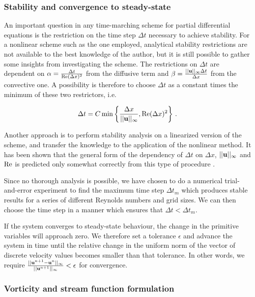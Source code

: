 \documentclass[final,3p,twocolumn]{elsarticle}
\begin{document}
\subsubsection{Stability and convergence to steady-state}

An important question in any time-marching scheme for partial differential
equations is the restriction on the time step $\Delta t$ necessary to achieve
stability. For a nonlinear scheme such as the one employed, analytical
stability restrictions are not available to the best knowledge of the author,
but it is still possible to gather some insights from investigating the scheme.
The restrictions on $\Delta t$ are dependent on $\alpha = \frac{\Delta t}{{\rm
Re} (\Delta x)^2}$ from the diffusive term and $\beta = \frac{||{\bf
u}||_{\infty} \Delta t}{\Delta x}$ from the convective one. A possibility is
therefore to choose $\Delta t$ as a constant times the minimum of these two
restrictors, i.e.\ 

\begin{equation}
    \Delta t = C \min \left\{ \frac{\Delta x}{||{\bf u}||_{\infty}}, {\rm Re} (\Delta x)^2
    \right\} \,.
    \label{eq:timeStep}
\end{equation}
 
Another approach is to perform stability analysis on a linearized version of
the scheme, and transfer the knowledge to the application of the nonlinear
method. It has been shown that the general form of the dependency of $\Delta t$
on $\Delta x$, $||{\bf u}||_{\infty}$ and ${\rm Re}$ is predicted only somewhat
correctly from this type of procedure \cite{kress2006time}. 

Since no thorough analysis is possible, we have chosen to do a numerical
trial-and-error experiment to find the maximum time step $\Delta t_m$ which
produces stable results for a series of different Reynolds numbers and grid
sizes. We can then choose the time step in a manner which ensures that $\Delta
t < \Delta t_m$. 

If the system converges to steady-state behaviour, the change in the primitive
variables will approach zero. We therefore set a tolerance $\epsilon$ and
advance the system in time until the relative change in the uniform norm of the
vector of discrete velocity values becomes smaller than that tolerance.  In
other words, we require $\frac{||{\bf u}^{n+1} - {\bf u}^{n}||_{\infty}}{
||{\bf u}^{n+1}||_{\infty}} < \epsilon$ for convergence. 

\subsubsection{Vorticity and stream function formulation}
\end{document}

